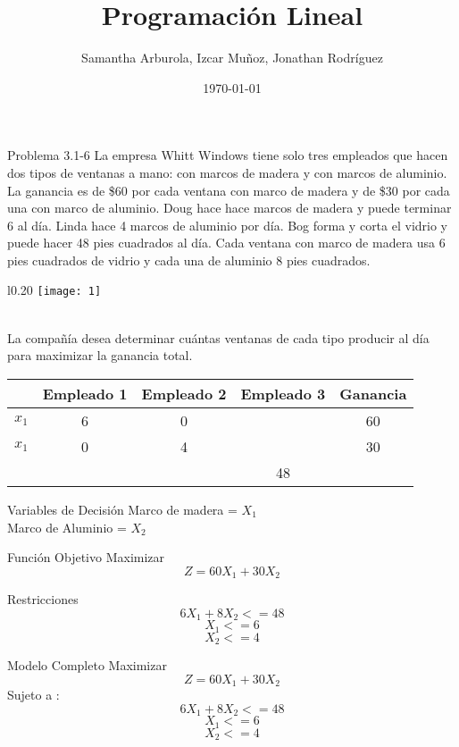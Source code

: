 \documentclass{beamer}
\author{Samantha Arburola, Izcar Muñoz, Jonathan Rodríguez}
\title{Programación Lineal}
\date{\today}
\begin{document}
\titlepageframe

\begin{frame}[t,fragile]{Problema 3.1-6}
La empresa Whitt Windows tiene solo tres empleados que hacen dos tipos de ventanas a mano: con marcos de madera y con marcos de aluminio. La ganancia es de \$60 por cada ventana con marco de madera y de \$30 por cada una con marco de aluminio. Doug hace hace marcos de madera y puede terminar 6 al día. Linda hace 4  marcos de aluminio por día. Bog forma y corta el vidrio y puede hacer 48 pies cuadrados al día. Cada ventana con marco de madera usa 6 pies cuadrados de vidrio y cada una de aluminio 8 pies cuadrados.\\ 
\begin{wrapfigure}{l}{0.20\textwidth}
    \centering
    \texttt{[image: 1]}
\end{wrapfigure}\\
La compañía desea determinar cuántas ventanas de cada tipo producir al día para maximizar la ganancia total.\\

\begin{tabular}{|c|c|c|c|c|}
\hline 
  & Empleado 1 & Empleado 2 & Empleado 3 & Ganancia \\ 
\hline 
\(x_{1}\) & 6 & 0 &   & 60 \\ 
\hline 
\(x_{1}\) & 0 & 4 &   &30 \\ 
\hline 
 &  &  & 48 &  \\ 
\hline 
\end{tabular} 

\end{frame}

\begin{frame}[fragile]{Variables de Decisión}
Marco de madera  = \(X_{1}\) \\
Marco de Aluminio = \(X_{2}\)
\end{frame}

\begin{frame}[fragile]{Función Objetivo}
Maximizar\\
\[Z = 60X_{1} + 30X_{2}\]
\end{frame}

\begin{frame}[fragile]{Restricciones}
\[6X_{1} + 8X_{2} <= 48\]
\[  X_{1} <= 6\]
\[  X_{2} <= 4\]
\end{frame}

\begin{frame}[fragile]{Modelo Completo}
Maximizar\\
\[Z = 60X_{1} + 30X_{2}\]
Sujeto a :\\
\[  6X_{1} + 8X_{2} <= 48\]
\[  X_{1} <= 6\]
\[  X_{2} <= 4\]
\end{frame}
\end{document}
